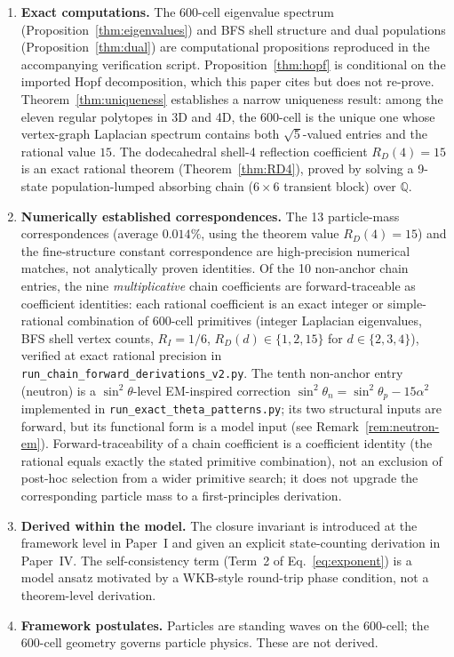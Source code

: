 \documentclass[12pt]{article}
\begin{document}
\begin{enumerate}
    \item \textbf{Exact computations.} The 600-cell eigenvalue spectrum (Proposition~\ref{thm:eigenvalues}) and BFS shell structure and dual populations (Proposition~\ref{thm:dual}) are computational propositions reproduced in the accompanying verification script. Proposition~\ref{thm:hopf} is conditional on the imported Hopf decomposition, which this paper cites but does not re-prove. Theorem~\ref{thm:uniqueness} establishes a narrow uniqueness result: among the eleven regular polytopes in 3D and 4D, the 600-cell is the unique one whose vertex-graph Laplacian spectrum contains both $\sqrt{5}$-valued entries and the rational value $15$. The dodecahedral shell-4 reflection coefficient $R_D(4) = 15$ is an exact rational theorem (Theorem~\ref{thm:RD4}), proved by solving a 9-state population-lumped absorbing chain ($6 \times 6$ transient block) over $\mathbb{Q}$.
    \item \textbf{Numerically established correspondences.} The 13 particle-mass correspondences (average $0.014\%$, using the theorem value $R_D(4) = 15$) and the fine-structure constant correspondence are high-precision numerical matches, not analytically proven identities. Of the 10 non-anchor chain entries, the nine \emph{multiplicative} chain coefficients are forward-traceable as coefficient identities: each rational coefficient is an exact integer or simple-rational combination of 600-cell primitives (integer Laplacian eigenvalues, BFS shell vertex counts, $R_I = 1/6$, $R_D(d) \in \{1, 2, 15\}$ for $d \in \{2, 3, 4\}$), verified at exact rational precision in \texttt{run\_chain\_forward\_derivations\_v2.py}. The tenth non-anchor entry (neutron) is a $\sin^2\theta$-level EM-inspired correction $\sin^2\theta_n = \sin^2\theta_p - 15\alpha^2$ implemented in \texttt{run\_exact\_theta\_patterns.py}; its two structural inputs are forward, but its functional form is a model input (see Remark~\ref{rem:neutron-em}). Forward-traceability of a chain coefficient is a coefficient identity (the rational equals exactly the stated primitive combination), not an exclusion of post-hoc selection from a wider primitive search; it does not upgrade the corresponding particle mass to a first-principles derivation.
    \item \textbf{Derived within the model.} The closure invariant is introduced at the framework level in Paper~I and given an explicit state-counting derivation in Paper~IV. The self-consistency term (Term~2 of Eq.~\eqref{eq:exponent}) is a model ansatz motivated by a WKB-style round-trip phase condition, not a theorem-level derivation.
    \item \textbf{Framework postulates.} Particles are standing waves on the 600-cell; the 600-cell geometry governs particle physics. These are not derived.
\end{enumerate}
\end{document}
